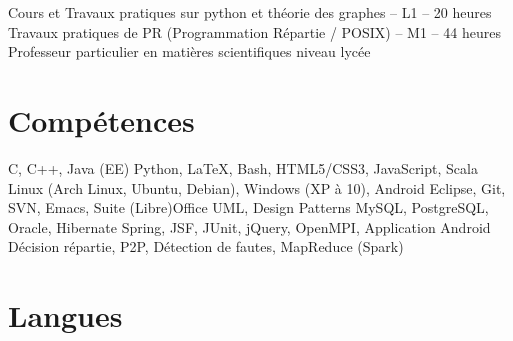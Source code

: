 \documentclass[11pt,a4paper,sans]{moderncv}
\begin{document}
       {Cours et Travaux pratiques sur python et théorie des graphes -- L1 -- 20 heures}
       {Travaux pratiques de PR (Programmation Répartie / POSIX) -- M1 -- 44 heures}
       {Professeur particulier en matières scientifiques niveau lycée}

\vspace{0.5em}


\section{Compétences}
\vspace{1em}

       {
            C,
            C++,
            Java (EE)
       }
       {
            Python,
            LaTeX,
            Bash,
            HTML5/CSS3,
            JavaScript,
            Scala
       }
       {
            Linux (Arch Linux, Ubuntu, Debian),
            Windows (XP à 10),
            Android
       }
       {
            Eclipse,
            Git,
            SVN,
            Emacs,
            Suite (Libre)Office
       }
       {
            UML,
            Design Patterns
       }
       {
            MySQL,
            PostgreSQL,
            Oracle,
            Hibernate
       }
       {
            Spring,
            JSF,
            JUnit,
            jQuery,
            OpenMPI,
            Application Android
       }
       {
            Décision répartie,
            P2P,
            Détection de fautes,
            MapReduce (Spark)
       }


\vspace{0.5em}


\section{Langues}
\vspace{1em}

\end{document}
